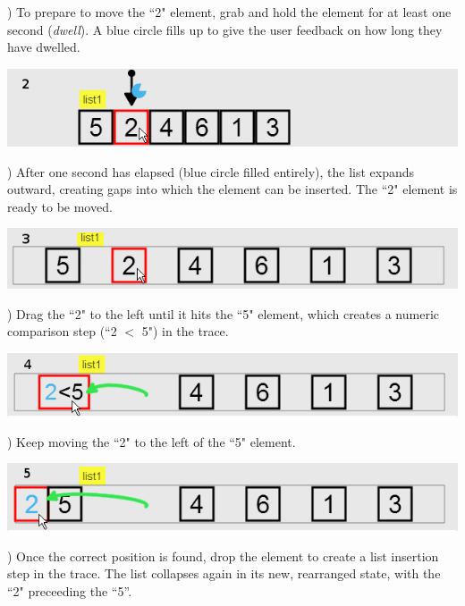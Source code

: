 ) To prepare to move the ``2" element, grab and hold the element for
at least one second (\emph{dwell}). A blue circle fills up to give the user
feedback on how long they have dwelled.

\vspace{-0.25em}
\noindent \includegraphics[width=0.7\columnwidth]{img/examples/insertion-2.png}
\vspace{0.4em}

) After one second has elapsed (blue circle filled entirely), the
list expands outward, creating gaps into which the element can be inserted. The
``2" element is ready to be moved.

\vspace{-0.25em}
\noindent \includegraphics[width=0.7\columnwidth]{img/examples/insertion-3.png}
\vspace{0.5em}

) Drag the ``2" to the left until it hits the ``5" element, which
creates a numeric comparison step (``2 $<$ 5") in the trace.

\vspace{-0.25em}
\noindent \includegraphics[width=0.7\columnwidth]{img/examples/insertion-4.png}
\vspace{0.5em}

) Keep moving the ``2" to the left of the ``5" element.

\vspace{-0.25em}
\noindent \includegraphics[width=0.7\columnwidth]{img/examples/insertion-5.png}
\vspace{0.5em}

) Once the correct position is found, drop the element
to create a list insertion step in the trace. The list collapses again in its new, rearranged state, with the
``2" preceeding the ``5''.


